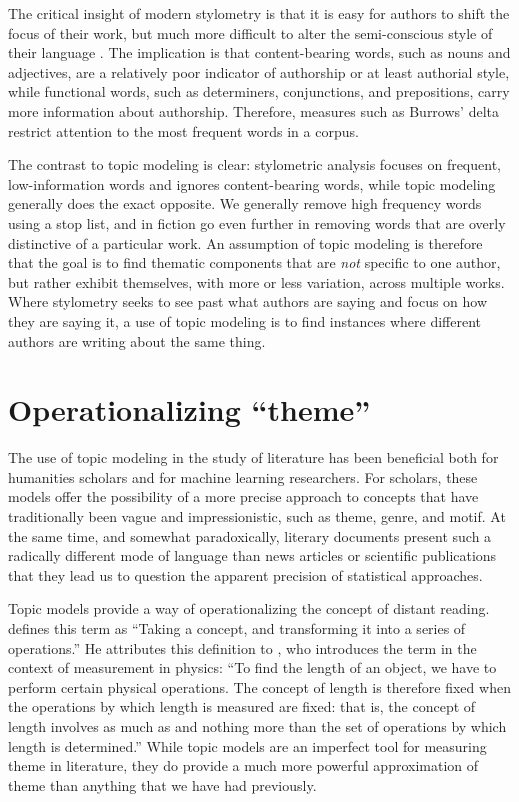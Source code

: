 The critical insight of modern stylometry is that it is easy for authors to shift the focus of their work, but much more difficult to alter the semi-conscious style of their language \cite{mosteller1964inference}.
The implication is that content-bearing words, such as nouns and adjectives, are a relatively poor indicator of authorship or at least authorial style, while functional words, such as determiners, conjunctions, and prepositions, carry more information about authorship.
Therefore, measures such as Burrows' delta \cite{burrows2002delta} restrict attention to the most frequent words in a corpus.

The contrast to topic modeling is clear: stylometric analysis focuses on frequent, low-information words and ignores content-bearing words, while topic modeling generally does the exact opposite.
We generally remove high frequency words using a stop list, and in fiction go even further in removing words that are overly distinctive of a particular work.
An assumption of topic modeling is therefore that the goal is to find thematic components that are {\em not} specific to one author, but rather exhibit themselves, with more or less variation, across multiple works.
Where stylometry seeks to see past what authors are saying and focus on how they are saying it, a use of topic modeling is to find instances where different authors are writing about the same thing.

\section{Operationalizing ``theme''}

The use of topic modeling in the study of literature has been beneficial both for humanities scholars and for machine learning researchers.
For scholars, these models offer the possibility of a more precise approach to concepts that have traditionally been vague and impressionistic, such as theme, genre, and motif.
At the same time, and somewhat paradoxically, literary documents present such a radically different mode of language than news articles or scientific publications that they lead us to question the apparent precision of statistical approaches.

Topic models provide a way of operationalizing the concept of distant reading.
\cite{moretti2013operationalizing} defines this term as ``Taking a concept, and transforming it into a series of operations.''
He attributes this definition to \cite{bridgman1927logic},  who introduces the term in the context of measurement in physics: ``To find the length of an object, we have to perform certain physical operations. The concept of length is therefore fixed when the operations by which length is measured are fixed: that is, the concept of length involves as much as and nothing more than the set of operations by which length is determined.''
While topic models are an imperfect tool for measuring theme in literature, they do provide a much more powerful approximation of theme than anything that we have had previously.

